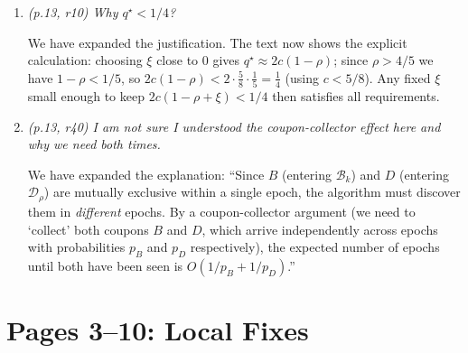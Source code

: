\documentclass[11pt]{article}
\newcommand{\RC}[1]{\textcolor{revcolor}{\textit{#1}}}
\newcommand{\resp}[1]{\smallskip\noindent #1\medskip}
\begin{document}
\begin{enumerate}[label=\textbf{L\arabic*.},leftmargin=*]
\resp{Tightened. The proof now states: ``since the $L$-bit prefix of the new
parent is a uniformly random string (from the reinitialisation), it contains
approximately $L/2$ one-bits in expectation; the total number of ones therefore
drops by at most $L/2 \le \tfrac12 \log_2 n$ when these are flipped.''}

\item \RC{(p.13, r10) Why $q^\star < 1/4$?}

\resp{We have expanded the justification. The text now shows the explicit
calculation: choosing $\xi$ close to $0$ gives
$q^\star \approx 2c(1-\rho)$; since $\rho > 4/5$ we have $1-\rho < 1/5$, so
$2c(1-\rho) < 2 \cdot \tfrac{5}{8} \cdot \tfrac{1}{5} = \tfrac{1}{4}$ (using
$c < 5/8$). Any fixed $\xi$ small enough to keep $2c(1-\rho+\xi) < 1/4$ then
satisfies all requirements.}

\item \RC{(p.13, r40) I am not sure I understood the coupon-collector effect
here and why we need both times.}

\resp{We have expanded the explanation: ``Since $B$ (entering
$\mathcal{B}_k$) and $D$ (entering $\mathcal{D}_\rho$) are mutually exclusive
within a single epoch, the algorithm must discover them in \emph{different}
epochs. By a coupon-collector argument (we need to `collect' both coupons $B$
and $D$, which arrive independently across epochs with probabilities $p_B$ and
$p_D$ respectively), the expected number of epochs until both have been seen is
$O(1/p_B + 1/p_D)$.''}

\end{enumerate}


\section*{Pages 3--10: Local Fixes}
\end{document}
